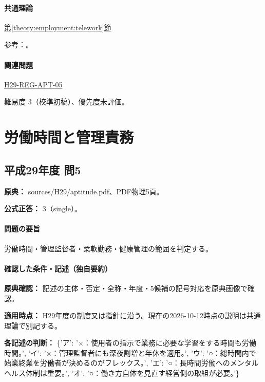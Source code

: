 \paragraph{共通理論} \hyperref[theory:employment:telework]{第\ref*{theory:employment:telework}節}

\par 参考：\cite{employment_telework2020,employment_telework_current}。

\paragraph{関連問題} \hyperref[q:h29-reg-apt-05]{H29-REG-APT-05}

\par 難易度 3（校準初稿）、優先度未評価。

\section{労働時間と管理責務}

\subsection{平成29年度 問5}
\label{q:h29-reg-apt-05}

\noindent\textbf{原典：} sources/H29/aptitude.pdf、PDF物理5頁。

\textbf{公式正答：} 3（single）。

\paragraph{問題の要旨} 労働時間・管理監督者・柔軟勤務・健康管理の範囲を判定する。

\paragraph{確認した条件・記述（独自要約）}\mbox{}\par

\noindent\textbf{原典確認：} 記述の主体・否定・全称・年度・5候補の記号対応を原典画像で確認。\par

\noindent\textbf{適用時点：} H29年度の制度又は指針に沿う。現在の2026-10-12時点の説明は共通理論で別記する。\par

\noindent\textbf{各記述の判断：} \{'ア': '×：使用者の指示で業務に必要な学習をする時間も労働時間。', 'イ': '×：管理監督者にも深夜割増と年休を適用。', 'ウ': '○：総時間内で始業終業を労働者が決めるのがフレックス。', 'エ': '○：長時間労働へのメンタルヘルス体制は重要。', 'オ': '○：働き方自体を見直す経営側の取組が必要。'\}\par

